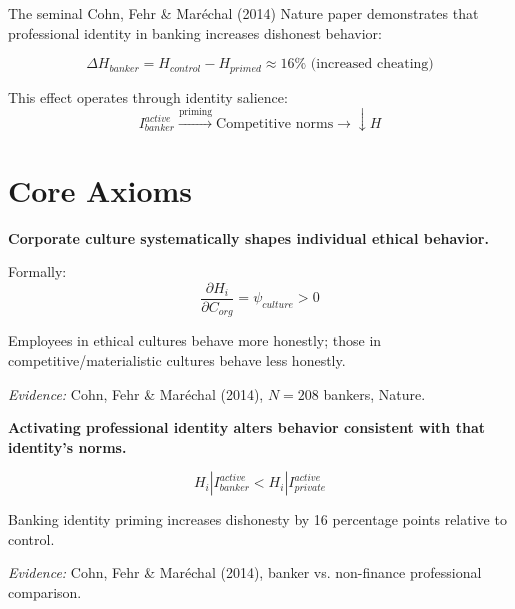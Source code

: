 The seminal Cohn, Fehr \& Maréchal (2014) Nature paper demonstrates that professional identity in banking increases dishonest behavior:

\begin{equation}
\Delta H_{banker} = H_{control} - H_{primed} \approx 16\% \text{ (increased cheating)}
\end{equation}

This effect operates through identity salience:
\begin{equation}
I_{banker}^{active} \xrightarrow{\text{priming}} \text{Competitive norms} \xrightarrow{} \downarrow H
\end{equation}

\section{Core Axioms}

\begin{tcolorbox}[colback=red!5!white,colframe=red!75!black,title=Axiom MM-1: Corporate Culture Effect]
\textbf{Corporate culture systematically shapes individual ethical behavior.}

Formally:
\begin{equation}
\frac{\partial H_i}{\partial C_{org}} = \psi_{culture} > 0
\end{equation}

Employees in ethical cultures behave more honestly; those in competitive/materialistic cultures behave less honestly.

\textit{Evidence:} Cohn, Fehr \& Maréchal (2014), $N=208$ bankers, Nature.
\end{tcolorbox}

\begin{tcolorbox}[colback=red!5!white,colframe=red!75!black,title=Axiom MM-2: Identity Priming Effect]
\textbf{Activating professional identity alters behavior consistent with that identity's norms.}

\begin{equation}
H_i | I_{banker}^{active} < H_i | I_{private}^{active}
\end{equation}

Banking identity priming increases dishonesty by 16 percentage points relative to control.

\textit{Evidence:} Cohn, Fehr \& Maréchal (2014), banker vs. non-finance professional comparison.
\end{tcolorbox}

